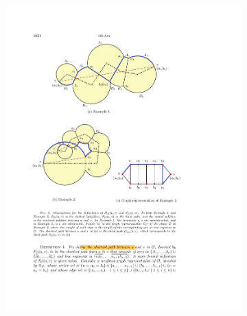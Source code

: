 \begin{figure}[ht]
\centering
\begin{subfigure}{.8\textwidth}
\centering
\includegraphics[width=.9\linewidth]{Figures/xia_a.pdf}
\caption{} \label{fig:xia_a}
\end{subfigure}


\end{figure}
